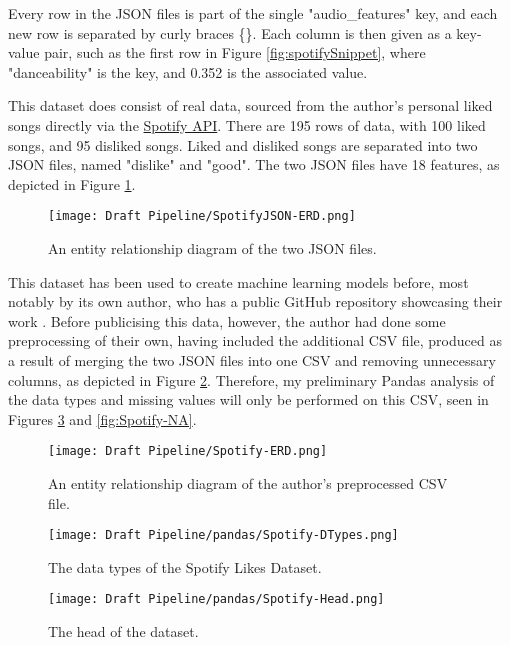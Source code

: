 Every row in the JSON files is part of the single "audio\_features" key, and each new row is separated by curly braces \{\}. Each column is then given as a 
key-value pair, such as the first row in Figure \ref{fig:spotifySnippet}, where "danceability" is the key, and 0.352 is the associated value.

\noindent This dataset does consist of real data, sourced from the author's personal liked songs directly via the 
\href{https://developer.spotify.com/documentation/web-api}{Spotify API}. There are 195 rows of data, with 100 liked songs, and 95 disliked songs.
Liked and disliked songs are separated into two JSON files, named "dislike" and "good". The two JSON files have 18 features, as depicted in Figure 
\ref{fig:JSON-ERD}. 

\begin{figure}[H]
    \centering
    \texttt{[image: Draft Pipeline/SpotifyJSON-ERD.png]}
    \caption{An entity relationship diagram of the two JSON files.}
    \label{fig:JSON-ERD}
\end{figure}

This dataset has been used to create machine learning models before, most notably by its own author, who has a public GitHub repository 
showcasing their work \autocite{brice-vergnou_brice-vergnouspotify_recommendation_2024}. 
Before publicising this data, however, the author had done some preprocessing of their own, having included the additional CSV file,
produced as a result of merging the two JSON files into one CSV and removing unnecessary columns, as depicted in Figure \ref{fig:Spotify-ERD}.
Therefore, my preliminary Pandas analysis of the data types and missing values will only be performed on this CSV, seen in Figures \ref{fig:Spotify-DTypes}
and \ref{fig:Spotify-NA}.

\begin{figure}[H]
    \centering
    \texttt{[image: Draft Pipeline/Spotify-ERD.png]}
    \caption{An entity relationship diagram of the author's preprocessed CSV file.}
    \label{fig:Spotify-ERD}
\end{figure}

\begin{figure}[H]
    \centering
    \texttt{[image: Draft Pipeline/pandas/Spotify-DTypes.png]}
    \caption{The data types of the Spotify Likes Dataset.}
    \label{fig:Spotify-DTypes}
\end{figure}

\begin{figure}[H]
    \centering
    \texttt{[image: Draft Pipeline/pandas/Spotify-Head.png]}
    \caption{The head of the dataset.}
    \label{fig:Spotify-Head}
\end{figure}

